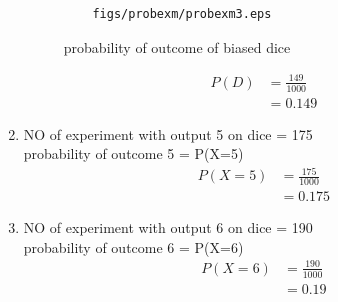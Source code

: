 \begin{enumerate}[label=\arabic*.,ref=\thesubsection.\theenumi]
\begin{figure}[!ht]
	\caption{probability of outcome of biased dice }
	\label{fig:bts3}
	\begin{lstlisting}
	figs/probexm/probexm3.eps
	\end{lstlisting}
\end{figure}
\begin{align}
P\left(D\right) &= \frac{149}{1000}
\\
&= 0.149
\end{align}
\item
NO of experiment with output 5 on dice = 175
\\
probability of outcome 5 = P(X=5)
\begin{align}
P\left(X=5\right) &= \frac{175}{1000}
\\
&= 0.175
\end{align}
\item
NO of experiment with output 6 on dice = 190
\\
probability of outcome 6 = P(X=6)
\begin{align}
P\left(X=6\right) &= \frac{190}{1000}
\\
&= 0.19
\end{align}
\end{enumerate}